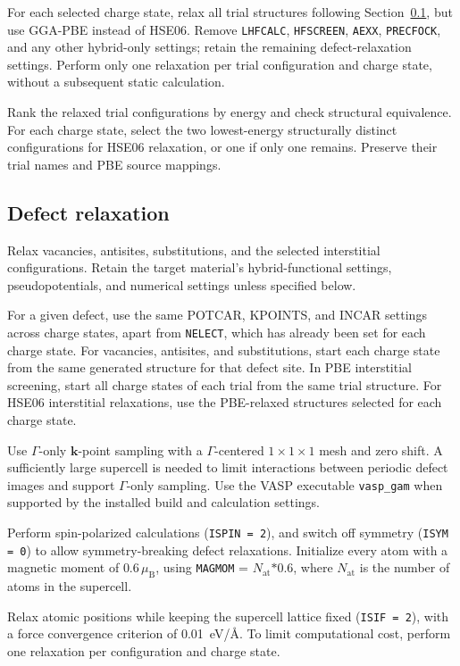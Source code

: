 \documentclass[aip,jap,reprint,amsmath,amssymb]{revtex4-2}
\begin{document}
For each selected charge state, relax all trial structures following Section~\ref{step:defect-relax}, but use GGA-PBE instead of HSE06. Remove \texttt{LHFCALC}, \texttt{HFSCREEN}, \texttt{AEXX}, \texttt{PRECFOCK}, and any other hybrid-only settings; retain the remaining defect-relaxation settings. Perform only one relaxation per trial configuration and charge state, without a subsequent static calculation.

Rank the relaxed trial configurations by energy and check structural equivalence. For each charge state, select the two lowest-energy structurally distinct configurations for HSE06 relaxation, or one if only one remains. Preserve their trial names and PBE source mappings.

\subsection{Defect relaxation}\label{step:defect-relax}

Relax vacancies, antisites, substitutions, and the selected interstitial configurations. Retain the target material's hybrid-functional settings, pseudopotentials, and numerical settings unless specified below.

For a given defect, use the same POTCAR, KPOINTS, and INCAR settings across charge states, apart from \texttt{NELECT}, which has already been set for each charge state. For vacancies, antisites, and substitutions, start each charge state from the same generated structure for that defect site. In PBE interstitial screening, start all charge states of each trial from the same trial structure. For HSE06 interstitial relaxations, use the PBE-relaxed structures selected for each charge state.

Use $\Gamma$-only $\bm{k}$-point sampling with a $\Gamma$-centered $1\times1\times1$ mesh and zero shift. A sufficiently large supercell is needed to limit interactions between periodic defect images and support $\Gamma$-only sampling. Use the VASP executable \texttt{vasp\_gam} when supported by the installed build and calculation settings.

Perform spin-polarized calculations (\texttt{ISPIN = 2}), and switch off symmetry (\texttt{ISYM = 0}) to allow symmetry-breaking defect relaxations. Initialize every atom with a magnetic moment of $0.6\,\mu_{\mathrm{B}}$, using \texttt{MAGMOM} = $N_{\mathrm{at}}\texttt{*}0.6$, where $N_{\mathrm{at}}$ is the number of atoms in the supercell.

Relax atomic positions while keeping the supercell lattice fixed (\texttt{ISIF = 2}), with a force convergence criterion of 0.01~eV/\AA{}. To limit computational cost, perform one relaxation per configuration and charge state.
\end{document}
